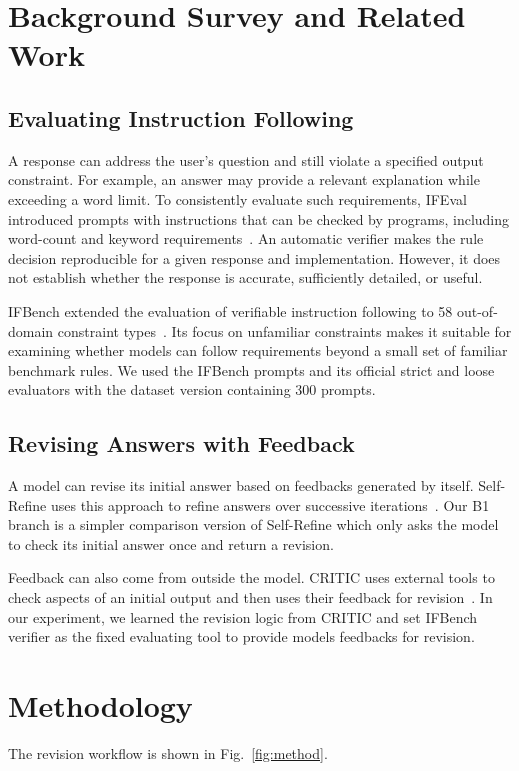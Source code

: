 \documentclass[conference]{IEEEtran}
\begin{document}
\section{Background Survey and Related Work}
\subsection{Evaluating Instruction Following}
A response can address the user's question and still violate a specified output constraint. For example, an answer may provide a relevant explanation while exceeding a word limit. To consistently evaluate such requirements, IFEval introduced prompts with instructions that can be checked by programs, including word-count and keyword requirements~\cite{zhou2023ifeval}. An automatic verifier makes the rule decision reproducible for a given response and implementation. However, it does not establish whether the response is accurate, sufficiently detailed, or useful.

IFBench extended the evaluation of verifiable instruction following to 58 out-of-domain constraint types~\cite{pyatkin2025ifbench}. Its focus on unfamiliar constraints makes it suitable for examining whether models can follow requirements beyond a small set of familiar benchmark rules. We used the IFBench prompts and its official strict and loose evaluators with the dataset version containing 300 prompts.
\subsection{Revising Answers with Feedback}
A model can revise its initial answer based on feedbacks generated by itself. Self-Refine uses this approach to refine answers over successive iterations~\cite{madaan2023selfrefine}. Our B1 branch is a simpler comparison version of Self-Refine which only asks the model to check its initial answer once and return a revision.

Feedback can also come from outside the model. CRITIC uses external tools to check aspects of an initial output and then uses their feedback for revision~\cite{gou2024critic}. In our experiment, we learned the revision logic from CRITIC and set IFBench verifier as the fixed evaluating tool to provide models feedbacks for revision.

\section{Methodology}
The revision workflow is shown in Fig.~\ref{fig:method}.
\end{document}
